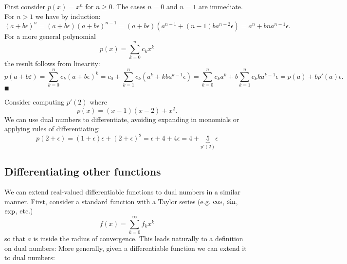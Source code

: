 First consider $p(x) = x^n$ for $n \ensuremath{\geq} 0$.  The cases $n = 0$ and $n = 1$ are immediate. For $n > 1$ we have by induction:
\[
(a + b \ensuremath{\epsilon})^n = (a + b \ensuremath{\epsilon}) (a + b \ensuremath{\epsilon})^{n-1} = (a + b \ensuremath{\epsilon}) (a^{n-1} + (n-1) b a^{n-2} \ensuremath{\epsilon}) = a^n + b n a^{n-1} \ensuremath{\epsilon}.
\]
For a more general polynomial
\[
p(x) = \ensuremath{\sum}_{k=0}^n c_k x^k
\]
the result follows from linearity:
\[
p(a + b \ensuremath{\varepsilon}) = \ensuremath{\sum}_{k=0}^n c_k (a+b\ensuremath{\epsilon})^k = c_0 + \ensuremath{\sum}_{k=1}^n c_k (a^k +k b a^{k-1}\ensuremath{\epsilon})
= \ensuremath{\sum}_{k=0}^n c_k a^k + b \ensuremath{\sum}_{k=1}^n c_k k a^{k-1}\ensuremath{\epsilon} = p(a) + b p'(a) \ensuremath{\epsilon}.
\]
\ensuremath{\QED}

\begin{example} Consider computing $p'(2)$ where
\[
p(x) = (x-1)(x-2) + x^2.
\]
We can use dual numbers to differentiate, avoiding expanding in monomials or applying rules of differentiating:
\[
p(2+\ensuremath{\epsilon}) = (1+\ensuremath{\epsilon})\ensuremath{\epsilon} + (2+\ensuremath{\epsilon})^2 = \ensuremath{\epsilon} + 4 + 4\ensuremath{\epsilon} = 4 + \underbrace{5}_{p'(2)}\ensuremath{\epsilon}
\]
\end{example}

\subsection{Differentiating other functions}
We can extend real-valued differentiable functions to dual numbers in a similar manner. First, consider a standard function with a Taylor series (e.g. ${\rm cos}$, ${\rm sin}$, ${\rm exp}$, etc.)
\[
f(x) = \ensuremath{\sum}_{k=0}^\ensuremath{\infty} f_k x^k
\]
so that $a$ is inside the radius of convergence. This leads naturally to a definition on dual numbers:
More generally, given a differentiable function we can extend it to dual numbers:

